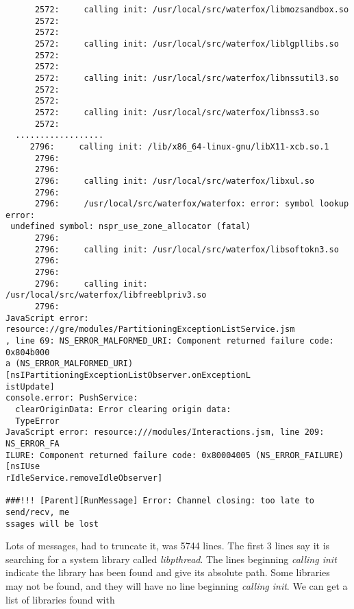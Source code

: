 \documentclass{article}  %
\begin{document}
\begin{verbatim}
      2572:     calling init: /usr/local/src/waterfox/libmozsandbox.so
      2572:
      2572:
      2572:     calling init: /usr/local/src/waterfox/liblgpllibs.so
      2572:
      2572:
      2572:     calling init: /usr/local/src/waterfox/libnssutil3.so
      2572:
      2572:
      2572:     calling init: /usr/local/src/waterfox/libnss3.so
      2572:
  ..................
     2796:     calling init: /lib/x86_64-linux-gnu/libX11-xcb.so.1
      2796:
      2796:
      2796:     calling init: /usr/local/src/waterfox/libxul.so
      2796:
      2796:     /usr/local/src/waterfox/waterfox: error: symbol lookup error:
 undefined symbol: nspr_use_zone_allocator (fatal)
      2796:
      2796:     calling init: /usr/local/src/waterfox/libsoftokn3.so
      2796:
      2796:
      2796:     calling init: /usr/local/src/waterfox/libfreeblpriv3.so
      2796:
JavaScript error: resource://gre/modules/PartitioningExceptionListService.jsm
, line 69: NS_ERROR_MALFORMED_URI: Component returned failure code: 0x804b000
a (NS_ERROR_MALFORMED_URI) [nsIPartitioningExceptionListObserver.onExceptionL
istUpdate]
console.error: PushService:
  clearOriginData: Error clearing origin data:
  TypeError
JavaScript error: resource:///modules/Interactions.jsm, line 209: NS_ERROR_FA
ILURE: Component returned failure code: 0x80004005 (NS_ERROR_FAILURE) [nsIUse
rIdleService.removeIdleObserver]

###!!! [Parent][RunMessage] Error: Channel closing: too late to send/recv, me
ssages will be lost
\end{verbatim}
Lots of messages, had to truncate it, was 5744 lines.
The first 3 lines say it is searching for a system library called {\em libpthread}. The lines beginning {\em calling init} indicate the library has been found and give its absolute path. Some libraries may not be found, and they will have no line beginning {\em calling init}. We can get a list of libraries found with 
\end{document}
